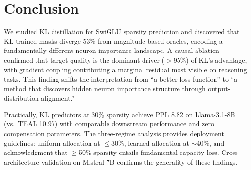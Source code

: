 \documentclass[11pt,a4paper]{article}
\begin{document}
\section{Conclusion}

We studied KL distillation for SwiGLU sparsity prediction and discovered that KL-trained masks diverge 53\% from magnitude-based oracles, encoding a fundamentally different neuron importance landscape. A causal ablation confirmed that target quality is the dominant driver ($>$95\%) of KL's advantage, with gradient coupling contributing a marginal residual most visible on reasoning tasks. This finding shifts the interpretation from ``a better loss function'' to ``a method that discovers hidden neuron importance structure through output-distribution alignment.''

Practically, KL predictors at 30\% sparsity achieve PPL 8.82 on Llama-3.1-8B (vs.\ TEAL 10.97) with comparable downstream performance and zero compensation parameters. The three-regime analysis provides deployment guidelines: uniform allocation at $\leq$30\%, learned allocation at ${\sim}$40\%, and acknowledgment that $\geq$50\% sparsity entails fundamental capacity loss. Cross-architecture validation on Mistral-7B confirms the generality of these findings.



\end{document}
